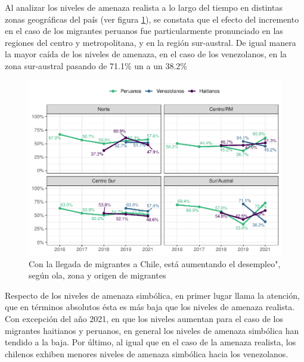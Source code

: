 \documentclass[
  12pt,
]{book}
\begin{document}
Al analizar los niveles de amenaza realista a lo largo del tiempo en distintas zonas geográficas del país (ver figura \ref{fig:amen1-zona}), se constata que el efecto del incremento en el caso de los migrantes peruanos fue particularmente pronunciado en las regiones del centro y metropolitana, y en la región sur-austral. De igual manera la mayor caída de los niveles de amenaza, en el caso de los venezolanos, en la zona sur-austral pasando de 71.1\% un a un 38.2\%

\begin{figure}

{\centering \includegraphics{reporte-elsoc_files/figure-latex/amen1-zona-1} 

}

\caption{Con la llegada de migrantes a Chile, está aumentando el desempleo", según ola, zona y origen de migrantes}\label{fig:amen1-zona}
\end{figure}

Respecto de los niveles de amenaza simbólica, en primer lugar llama la atención, que en términos absolutos ésta es más baja que los niveles de amenaza realista. Con excepción del año 2021, en que los niveles aumentan para el caso de los migrantes haitianos y peruanos, en general los niveles de amenaza simbólica han tendido a la baja. Por último, al igual que en el caso de la amenaza realista, los chilenos exhiben menores niveles de amenaza simbólica hacia los venezolanos.
\end{document}
